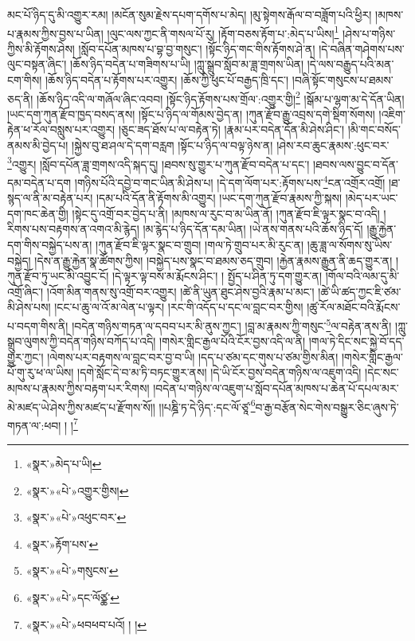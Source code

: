 མང་པོ་ཉིད་དུ་མི་འགྱུར་རམ། །མངོན་སུམ་རྗེས་དཔག་དགོས་པ་མེད། །མུ་སྟེགས་རྒོལ་བ་བཟློག་པའི་ཕྱིར། །མཁས་པ་རྣམས་ཀྱིས་བྱས་པ་ཡིན། །ལུང་ལས་ཀྱང་ནི་གསལ་པོ་རུ། །རྟོག་བཅས་རྟོག་པ་:མེད་པ་ཡིས།\footnote{«སྣར་»མེད་པ་ཡི།} །ཤེས་པ་གཉིས་ཀྱིས་མི་རྟོགས་ཤེས། །སློབ་དཔོན་མཁས་པ་བྷ་བྱ་གསུང་། །སྟོང་ཉིད་གང་གིས་རྟོགས་ཤེ་ན། །དེ་བཞིན་གཤེགས་པས་ལུང་བསྟན་ཞིང་། །ཆོས་ཉིད་བདེན་པ་གཟིགས་པ་ཡི། །ཀླུ་སྒྲུབ་སློབ་མ་ཟླ་གྲགས་ཡིན། །དེ་ལས་བརྒྱུད་པའི་མན་ངག་གིས། །ཆོས་ཉིད་བདེན་པ་རྟོགས་པར་འགྱུར། །ཆོས་ཀྱི་ཕུང་པོ་བརྒྱད་ཁྲི་དང་། །བཞི་སྟོང་གསུངས་པ་ཐམས་ཅད་ནི། །ཆོས་ཉིད་འདི་ལ་གཞོལ་ཞིང་འབབ། །སྟོང་ཉིད་རྟོགས་པས་གྲོལ་:འགྱུར་གྱི།\footnote{«སྣར་»«པེ་»འགྱུར་གྱིས།} །སྒོམ་པ་ལྷག་མ་དེ་དོན་ཡིན། །ཡང་དག་ཀུན་རྫོབ་ཁྱད་བསད་ནས། །སྟོང་པ་ཉིད་ལ་གོམས་བྱེད་ན། །ཀུན་རྫོབ་རྒྱུ་འབྲས་དགེ་སྡིག་སོགས། །འཇིག་རྟེན་ཕ་རོལ་བསླུས་པར་འགྱུར། །ཅུང་ཟད་ཐོས་པ་ལ་བརྟེན་ཏེ། །རྣམ་པར་བདེན་དོན་མི་ཤེས་ཤིང་། །མི་གང་བསོད་ནམས་མི་བྱེད་པ། །སྐྱེས་བུ་ཐ་ཤལ་དེ་དག་བརླག །སྟོང་པ་ཉིད་ལ་བལྟ་ཉེས་ན། །ཤེས་རབ་ཆུང་རྣམས་:ཕུང་བར་\footnote{«སྣར་»«པེ་»འཕུང་བར་}འགྱུར། །སློབ་དཔོན་ཟླ་གྲགས་འདི་སྐད་དུ། །ཐབས་སུ་གྱུར་པ་ཀུན་རྫོབ་བདེན་པ་དང་། །ཐབས་ལས་བྱུང་བ་དོན་དམ་བདེན་པ་དག །གཉིས་པོའི་དབྱེ་བ་གང་ཡིན་མི་ཤེས་པ། །དེ་དག་ལོག་པར་:རྟོགས་པས་\footnote{«སྣར་»རྟོག་པས་}ངན་འགྲོར་འགྲོ། །ཐ་སྙད་ལ་ནི་མ་བརྟེན་པར། །དམ་པའི་དོན་ནི་རྟོགས་མི་འགྱུར། །ཡང་དག་ཀུན་རྫོབ་རྣམས་ཀྱི་སྐས། །མེད་པར་ཡང་དག་ཁང་ཆེན་གྱི། །སྟེང་དུ་འགྲོ་བར་བྱེད་པ་ནི། །མཁས་ལ་རུང་བ་མ་ཡིན་ནོ། །ཀུན་རྫོབ་ཇི་ལྟར་སྣང་བ་འདི། །རིགས་པས་བརྟགས་ན་འགའ་མི་རྙེད། །མ་རྙེད་པ་ཉིད་དོན་དམ་ཡིན། །ཡེ་ནས་གནས་པའི་ཆོས་ཉིད་དོ། །རྒྱུ་རྐྱེན་དག་གིས་བསྐྱེད་པས་ན། །ཀུན་རྫོབ་ཇི་ལྟར་སྣང་བ་གྲུབ། །གལ་ཏེ་གྲུབ་པར་མི་རུང་ན། །ཆུ་ཟླ་ལ་སོགས་སུ་ཡིས་བསྐྱེད། །དེས་ན་རྒྱུ་རྐྱེན་སྣ་ཚོགས་ཀྱིས། །བསྐྱེད་པས་སྣང་བ་ཐམས་ཅད་གྲུབ། །རྐྱེན་རྣམས་རྒྱུན་ནི་ཆད་གྱུར་ན། །ཀུན་རྫོབ་ཏུ་ཡང་མི་འབྱུང་ངོ། །དེ་ལྟར་ལྟ་བས་མ་རྨོངས་ཤིང་། །
སྤྱོད་པ་ཤིན་ཏུ་དག་གྱུར་ན། །གོལ་བའི་ལམ་དུ་མི་འགྲོ་ཞིང་། །འོག་མིན་གནས་སུ་འགྲོ་བར་འགྱུར། །ཚེ་ནི་ཡུན་ཐུང་ཤེས་བྱའི་རྣམ་པ་མང་། །ཚེ་ཡི་ཚད་ཀྱང་ཇི་ཙམ་མི་ཤེས་པས། །ངང་པ་ཆུ་ལ་འོ་མ་ལེན་པ་ལྟར། །རང་གི་འདོད་པ་དང་ལ་བླང་བར་གྱིས། །ཚུ་རོལ་མཐོང་བའི་རྨོངས་པ་བདག་གིས་ནི། །བདེན་གཉིས་གཏན་ལ་དབབ་པར་མི་ནུས་ཀྱང་། །བླ་མ་རྣམས་ཀྱི་གསུང་\footnote{«སྣར་»«པེ་»གསུངས་}ལ་བརྟེན་ནས་ནི། །ཀླུ་སྒྲུབ་ལུགས་ཀྱི་བདེན་གཉིས་བཀོད་པ་འདི། །གསེར་གླིང་རྒྱལ་པོའི་ངོར་བྱས་འདི་ལ་ནི། །གལ་ཏེ་དིང་སང་སྐྱེ་བོ་དད་གྱུར་ཀྱང་། །ལེགས་པར་བརྟགས་ལ་བླང་བར་བྱ་བ་ཡི། །དད་པ་ཙམ་དང་གུས་པ་ཙམ་གྱིས་མིན། །གསེར་གླིང་རྒྱལ་པོ་གུ་རུ་ཕ་ལ་ཡིས། །དགེ་སློང་དེ་བ་མ་ཏི་བཏང་གྱུར་ནས། །དེ་ཡི་ངོར་བྱས་བདེན་གཉིས་ལ་འཇུག་འདི། །དེང་སང་མཁས་པ་རྣམས་ཀྱིས་བརྟག་པར་རིགས། །བདེན་པ་གཉིས་ལ་འཇུག་པ་སློབ་དཔོན་མཁས་པ་ཆེན་པོ་དཔལ་མར་མེ་མཛད་ཡེ་ཤེས་ཀྱིས་མཛད་པ་རྫོགས་སོ།། །།པཎྜི་ཏ་དེ་ཉིད་:དང་ལོ་ཙཱ་\footnote{«སྣར་»«པེ་»དང་ལོཙྪ་}བ་རྒྱ་བརྩོན་སེང་གེས་བསྒྱུར་ཅིང་ཞུས་ཏེ་གཏན་ལ་:ཕབ། ། །\footnote{«སྣར་»«པེ་»ཕབཕབ་པའོ། ། །}